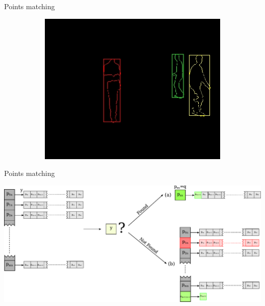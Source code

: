 \begin{frame}{Points matching}
\begin{center}
\begin{figure}[t]
\begin{subfigure}[b]{0.32\textwidth}
	\includegraphics[width=\textwidth]{fig3.jpg}
      \end{subfigure}%
    \end{figure}
  \end{center}
\end{frame}

\begin{frame}{Points matching}
  \begin{center}
    \includegraphics[width=\textwidth]{fig4.pdf}
  \end{center}
\end{frame}

